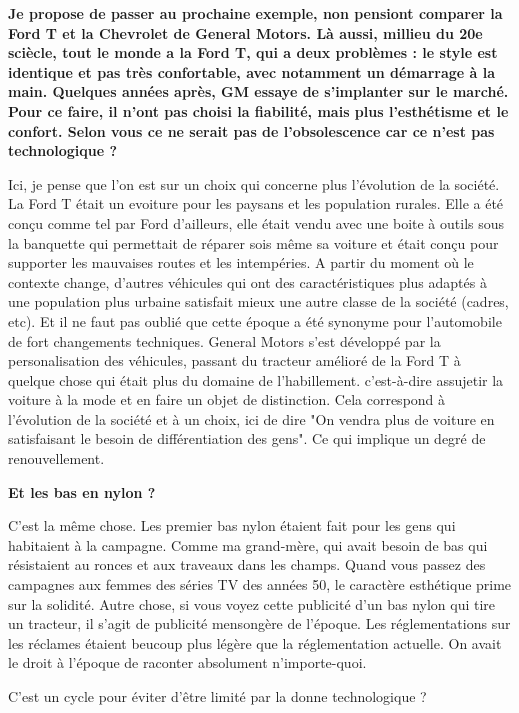 \begin{small}
\textbf{Je propose de passer au prochaine exemple, non pensiont comparer la Ford T et la Chevrolet de General Motors. Là aussi, millieu du 20e sciècle, tout le monde a la Ford T, qui a deux problèmes : le style  est identique et pas très confortable, avec notamment un démarrage à la main. Quelques années après, GM essaye de s'implanter sur le marché. Pour ce faire, il n'ont pas choisi la fiabilité, mais plus l'esthétisme et le confort. Selon vous ce ne serait pas de l'obsolescence car ce n'est pas technologique ?}
\smallbreak


Ici, je pense que l'on est sur un choix qui concerne plus l'évolution de la société.
La Ford T était un evoiture pour les paysans et les population rurales. Elle a été conçu comme tel par Ford d'ailleurs, elle était vendu avec une boite à outils sous la banquette qui permettait de réparer sois même sa voiture et était conçu pour supporter les mauvaises routes et les intempéries.
A partir du moment où le contexte change, d'autres véhicules qui ont des caractéristiques plus adaptés à une population plus urbaine satisfait mieux une autre classe de la société (cadres, etc).
Et il ne faut pas oublié que cette époque a été synonyme pour l'automobile de fort changements techniques. General Motors s'est développé par la personalisation des véhicules, passant du tracteur amélioré de la Ford T à quelque chose qui était plus du domaine de l'habillement. c'est-à-dire assujetir la voiture à la mode et en faire un objet de distinction.
Cela correspond à l'évolution de la société et à un choix, ici de dire "On vendra plus de voiture en satisfaisant le besoin de différentiation des gens". Ce qui implique un degré de renouvellement.

\textbf{Et les bas en nylon ?}
\smallbreak


C'est la même chose. Les premier bas nylon étaient fait pour les gens qui habitaient à la campagne. Comme ma grand-mère, qui avait besoin de bas qui résistaient au ronces et aux traveaux dans les champs.
Quand vous passez des campagnes aux femmes des séries TV des années 50, le caractère esthétique prime sur la solidité. Autre chose, si vous voyez cette publicité d'un bas nylon qui tire un tracteur, il s'agit de publicité mensongère de l'époque. Les réglementations sur les réclames étaient beucoup plus légère que la réglementation actuelle. On avait le droit à l'époque de raconter absolument n'importe-quoi.

C'est un cycle pour éviter d'être limité par la donne technologique ?


\end{small}
